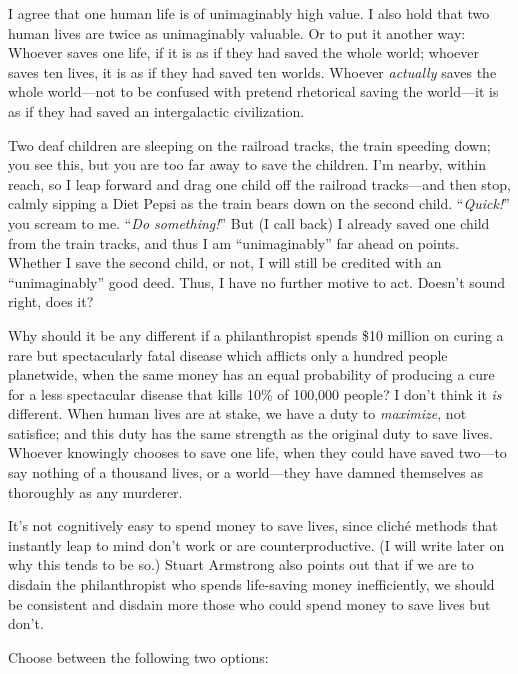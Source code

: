{
 I agree that one human life is of unimaginably high value. I also
hold that two human lives are twice as unimaginably valuable. Or to put
it another way: Whoever saves one life, if it is as if they had saved
the whole world; whoever saves ten lives, it is as if they had saved
ten worlds. Whoever \textit{actually} saves the whole world---not to be
confused with pretend rhetorical saving the world---it is as if they
had saved an intergalactic civilization.}

{
 Two deaf children are sleeping on the railroad tracks, the train
speeding down; you see this, but you are too far away to save the
children. I'm nearby, within reach, so I leap forward
and drag one child off the railroad tracks---and then stop, calmly
sipping a Diet Pepsi as the train bears down on the second child.
``\textit{Quick!}'' you scream to
me. ``\textit{Do something!}'' But
(I call back) I already saved one child from the train tracks, and thus
I am ``unimaginably'' far ahead on
points. Whether I save the second child, or not, I will still be
credited with an ``unimaginably''
good deed. Thus, I have no further motive to act.
Doesn't sound right, does it?}

{
 Why should it be any different if a philanthropist spends \$10
million on curing a rare but spectacularly fatal disease which afflicts
only a hundred people planetwide, when the same money has an equal
probability of producing a cure for a less spectacular disease that
kills 10\% of 100,000 people? I don't think it
\textit{is} different. When human lives are at stake, we have a duty to
\textit{maximize}, not satisfice; and this duty has the same strength
as the original duty to save lives. Whoever knowingly chooses to save
one life, when they could have saved two---to say nothing of a thousand
lives, or a world---they have damned themselves as thoroughly as any
murderer.}

{
 It's not cognitively easy to spend money to save
lives, since cliché methods that instantly leap to mind
don't work or are counterproductive. (I will write
later on why this tends to be so.) Stuart Armstrong also points out
that if we are to disdain the philanthropist who spends life-saving
money inefficiently, we should be consistent and disdain more those who
could spend money to save lives but don't.}

\myendsectiontext


{
 Choose between the following two options:}

